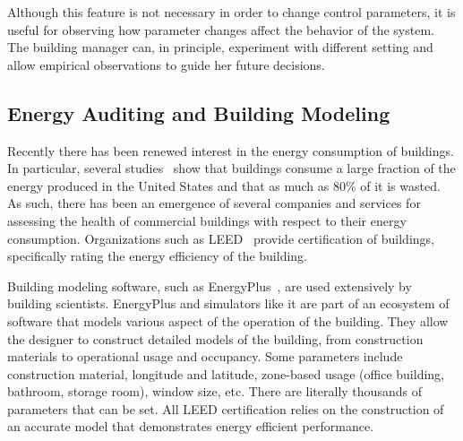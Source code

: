 Although this feature is not necessary in order to change control parameters, it is useful for observing how parameter changes
affect the behavior of the system.  The building manager can, in principle, experiment with different setting and allow
empirical observations to guide her future decisions.



\subsection{Energy Auditing and Building Modeling}
\label{sec:elensvision}
Recently there has been renewed interest in the energy consumption of buildings.  In particular, several studies~\cite{BuildingEnergyData,
MITBuildingScience} show that buildings consume a large fraction of the energy produced in the United States and that as much
as 80\% of it is wasted\cite{waste_science, next10_waste}.  As such, there has been an emergence of several companies and 
services for assessing the health of
commercial buildings with respect to their energy consumption.  Organizations such as LEED~\cite{Leed} provide certification of 
buildings, specifically rating the energy efficiency of the building.

Building modeling software, such as EnergyPlus~\cite{eplus}, are used extensively by building scientists. 
EnergyPlus and simulators like it are part of an ecosystem of software that models various aspect of the operation
of the building.  They allow the designer to construct detailed models of the building, from construction materials to 
operational usage and occupancy.  Some parameters include
construction material, longitude and latitude, zone-based usage (office building, bathroom, storage room), window size, etc.  
There are literally thousands of parameters that can be set.  All LEED certification relies on the construction of an 
accurate model that demonstrates energy efficient performance.

